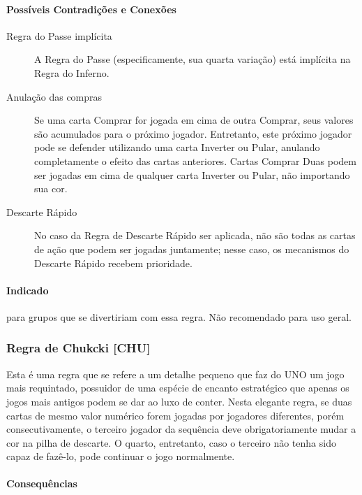 \paragraph{Possíveis Contradições e Conexões}

\begin{description}
\item[Regra do Passe implícita]{A Regra do Passe (especificamente, sua quarta variação) está implícita na Regra do Inferno.}
\item[Anulação das compras]{Se uma carta Comprar for jogada em cima de outra Comprar, seus valores são acumulados para o próximo jogador. Entretanto, este próximo jogador pode se defender utilizando uma carta Inverter ou Pular, anulando completamente o efeito das cartas anteriores. Cartas Comprar Duas podem ser jogadas em cima de qualquer carta Inverter ou Pular, não importando sua cor.}
\item[Descarte Rápido]{No caso da Regra de Descarte Rápido ser aplicada, não são todas as cartas de ação que podem ser jogadas juntamente; nesse caso, os mecanismos do Descarte Rápido recebem prioridade.}
\end{description}

\paragraph{Indicado} 

para grupos que se divertiriam com essa regra. Não recomendado para uso geral.

\subsubsection{Regra de Chukcki [CHU]}

Esta é uma regra que se refere a um detalhe pequeno que faz do UNO um jogo mais requintado, possuidor de uma espécie de encanto estratégico que apenas os jogos mais antigos podem se dar ao luxo de conter. Nesta elegante regra, se duas cartas de mesmo valor numérico forem jogadas por jogadores diferentes, porém consecutivamente, o terceiro jogador da sequência deve obrigatoriamente mudar a cor na pilha de descarte. O quarto, entretanto, caso o terceiro não tenha sido capaz de fazê-lo, pode continuar o jogo normalmente. 

\paragraph{Consequências} 

